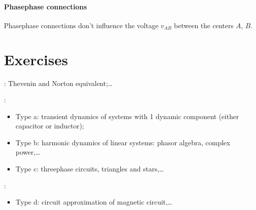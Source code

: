 \documentclass[letterpaper,10pt,english]{jupyterBook}
\begin{document}
\paragraph{Phase\sphinxhyphen{}phase connections}
\label{\detokenize{ch/electrical-engineering-three-phase:phase-phase-connections}}
\sphinxAtStartPar
Phase\sphinxhyphen{}phase connections don’t influence the voltage \(v_{AB}\) between the centers \(A\), \(B\).

\sphinxAtStartPar
{} 

\begin{figure}[htbp]
\centering

\noindent{}
\end{figure}

\sphinxstepscope


\section{Exercises}
\label{\detokenize{ch/electrical-engineering-exercises:exercises}}\label{\detokenize{ch/electrical-engineering-exercises:classical-electromagnetism-electrical-engineering-exercises}}\label{\detokenize{ch/electrical-engineering-exercises::doc}}
\sphinxAtStartPar
{}: Thevenin and Norton equivalent;…

\sphinxAtStartPar
{}:
\begin{itemize}
\item {} 
\sphinxAtStartPar
Type a: transient dynamics of systems with 1 dynamic component (either capacitor or inductor);

\item {} 
\sphinxAtStartPar
Type b: harmonic dynamics of linear systems: phasor algebra, complex power,…

\item {} 
\sphinxAtStartPar
Type c: three\sphinxhyphen{}phase circuits, triangles and stars,…

\end{itemize}

\sphinxAtStartPar
{}:
\begin{itemize}
\item {} 
\sphinxAtStartPar
Type d: circuit approximation of magnetic circuit,…

\end{itemize}
\end{document}

